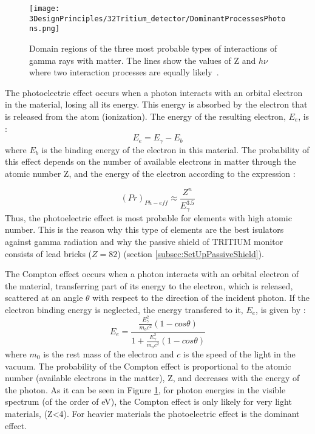 \begin{figure}[h]
\centering
\texttt{[image: 3DesignPrinciples/32Tritium\_detector/DominantProcessesPhotons.png]}
\caption{Domain regions of the three most probable types of interactions of gamma rays with matter. The lines show the values of Z and $h\nu$ where two interaction processes are equally likely\label{fig:ProcessesPhotons}~\cite{Knoll}.}
\end{figure}

The photoelectric effect occurs when a photon interacts with an orbital electron in the material, losing all its energy. This energy is absorbed by the electron that is released from the atom (ionization). The energy of the resulting electron, $E_e$, is \cite{Knoll, Leo}:
\begin{equation}
E_e = E_\gamma - E_b 
\label{eq:PhotoelectricEffect}
\end{equation}
where $E_b$ is the binding energy of the electron in this material. The probability of this effect depends on the number of available electrons in matter through the atomic number Z, and the energy of the electron according to the expression \cite{Knoll}:

\begin{equation}
\left(Pr\right)_{Ph-eff} \approx \frac{Z^n}{E_\gamma^{3.5}}
\label{eq:PhotoelectricProb}
\end{equation}
Thus, the photoelectric effect is most probable for elements with high atomic number. This is the reason why this type of elements are the best isulators against gamma radiation and why the passive shield of TRITIUM monitor consists of lead bricks ($Z=82$) (section \ref{subsec:SetUpPassiveShield}). %

The Compton effect occurs when a photon interacts with an orbital electron of the material, transferring part of its energy to the electron, which is released, scattered at an angle $\theta$ with respect to the direction of the incident photon. If the electron binding energy is neglected, the energy transfered to it, $E_e$, is given by \cite{Knoll, Leo}:
\begin{equation}
E_e=\frac{\displaystyle{\frac{E_\gamma^2}{m_oc^2}}\left(1-cos\theta\right)}{1+ \displaystyle{\frac{E_\gamma^2}{m_oc^2}}\left(1-cos\theta\right)}
\label{eq:ComptonEffect}
\end{equation}
where $m_0$ is the rest mass of the electron and $c$ is the speed of the light in the vacuum. The probability of the Compton effect is proportional to the atomic number (available electrons in the matter), Z,  and decreases with the energy of the photon. As it can be seen in Figure \ref{fig:ProcessesPhotons}, for photon energies in the visible spectrum (of the order of eV), the Compton effect is only likely for very light materials, (Z<4). For heavier materials the photoelectric effect is the dominant effect.

